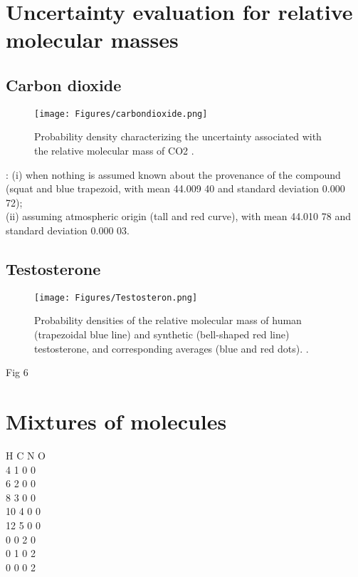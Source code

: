 \documentclass[a5paper,openany]{book}
\begin{document}
\section{Uncertainty evaluation for relative molecular masses}

\subsection{Carbon dioxide}

\begin{figure}[ht] 
	\centering\small
	\unitlength=1mm
	{\texttt{[image: Figures/carbondioxide.png]}} 
	\caption {Probability density characterizing the uncertainty associated with the relative molecular mass of CO2 \cite{IUPACUncertainty}.} 
	\label{f:carbondioxide}
\end{figure}

: (i) when nothing
is assumed known about the provenance of the compound (squat and blue trapezoid, with mean 44.009 40 and standard deviation
0.000 72); \\
(ii) assuming atmospheric origin (tall and red curve), with mean 44.010 78 and standard deviation 0.000 03.




\subsection{Testosterone}

\begin{figure}[ht] 
	\centering\small
	\unitlength=1mm
	{\texttt{[image: Figures/Testosteron.png]}} 
	\caption { Probability densities of the relative molecular mass of human (trapezoidal blue line) and synthetic (bell-shaped red line) testosterone, and corresponding averages (blue and red dots). \cite{IUPACUncertainty}.} 
	\label{f:Testosteron}
\end{figure}

Fig 6 \\

\section{Mixtures of molecules}


H C N O \\
4 1 0 0 \\
6 2 0 0 \\
8 3 0 0 \\
10 4 0 0 \\
12 5 0 0 \\
0 0 2 0 \\
0 1 0 2 \\
0 0 0 2 \\
\end{document}
